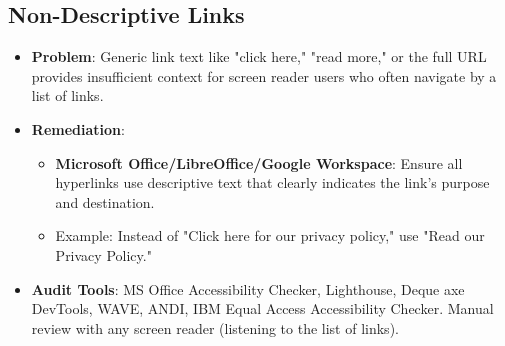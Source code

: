 \subsection{Non-Descriptive Links}
\label{subsec:non-descriptive-links}
\begin{itemize}
    \item \textbf{Problem}: Generic link text like "click here," "read more," or the full URL provides insufficient context for screen reader users who often navigate by a list of links.

    \item \textbf{Remediation}:
        \begin{itemize}
            \item \textbf{Microsoft Office/LibreOffice/Google Workspace}: Ensure all hyperlinks use descriptive text that clearly indicates the link's purpose and destination.
            \item Example: Instead of "Click here for our privacy policy," use "Read our Privacy Policy."
        \end{itemize}

    \item \textbf{Audit Tools}: MS Office Accessibility Checker, Lighthouse, Deque axe DevTools, WAVE, ANDI, IBM Equal Access Accessibility Checker. Manual review with any screen reader (listening to the list of links).

\end{itemize}

